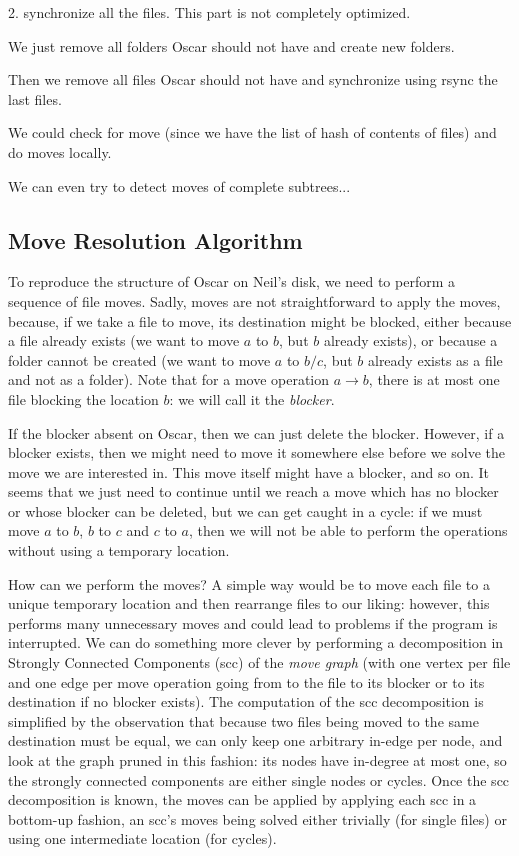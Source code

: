 \documentclass[11pt]{llncs}
\begin{document}
2. synchronize all the files. This part is not completely optimized.\smallskip

We just remove all folders Oscar should not have and create new folders.\smallskip

Then we remove all files Oscar should not have and synchronize using rsync the last files.\smallskip

We could check for move (since we have the list of hash of contents of files) and do moves locally.\smallskip

We can even try to detect moves of complete subtrees...\smallskip

\subsection{Move Resolution Algorithm}

To reproduce the structure of Oscar on Neil's disk, we need to perform a sequence of file moves. Sadly, moves are not straightforward to apply the moves, because, if we take a file to move, its destination might be blocked, either because a file already exists (we want to move $a$ to $b$, but $b$ already exists), or because a folder cannot be created (we want to move $a$ to $b/c$, but $b$ already exists as a file and not as a folder). Note that for a move operation $a \rightarrow b$, there is at most one file blocking the location $b$: we will call it the {\sl blocker}.

If the blocker absent on Oscar, then we can just delete the blocker. However, if a blocker exists, then we might need to move it somewhere else before we solve the move we are interested in. This move itself might have a blocker, and so on. It seems that we just need to continue until we reach a move which has no blocker or whose blocker can be deleted, but we can get caught in a cycle: if we must move $a$ to $b$, $b$ to $c$ and $c$ to $a$, then we will not be able to perform the operations without using a temporary location.

How can we perform the moves? A simple way would be to move each file to a unique temporary location and then rearrange files to our liking: however, this performs many unnecessary moves and could lead to problems if the program is interrupted. We can do something more clever by performing a decomposition in Strongly Connected Components ({\sc scc}) of the {\sl move graph} (with one vertex per file and one edge per move operation going from to the file to its blocker or to its destination if no blocker exists). The computation of the {\sc scc} decomposition is simplified by the observation that because two files being moved to the same destination must be equal, we can only keep one arbitrary in-edge per node, and look at the graph pruned in this fashion: its nodes have in-degree at most one, so the strongly connected components are either single nodes or cycles. Once the {\sc scc} decomposition is known, the moves can be applied by applying each {\sc scc} in a bottom-up fashion, an {\sc scc}'s moves being solved either trivially (for single files) or using one intermediate location (for cycles).
\end{document}
